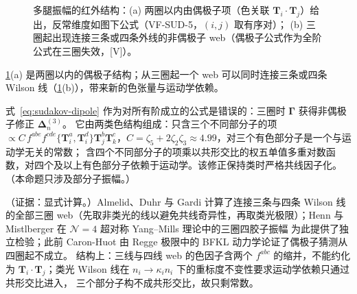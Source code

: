 \begin{figure}[htbp]
\caption{多腿振幅的红外结构：(a) 两圈以内由偶极子项（色关联 $\mathbf T_i\cdot\mathbf T_j$）给出，反常维度如图下公式（VF-SUD-5，$(i,j)$ 取有序对）；
(b) 三圈起出现连接三条或四条外线的非偶极子 web（偶极子公式作为全阶公式在三圈失效，[V]）。}
\label{fig:sudakov-dipole}
\end{figure}

\cref{fig:sudakov-dipole}(a) 是两圈以内的偶极子结构；从三圈起一个 web 可以同时连接三条或四条 Wilson 线（\cref{fig:sudakov-dipole}(b)），带来新的色张量与运动学依赖。

\begin{proposition}\label{prop:sudakov-dipole-violation}
式~\eqref{eq:sudakov-dipole} 作为对所有阶成立的公式是错误的：三圈时 $\boldsymbol\Gamma$ 获得非偶极子修正 $\boldsymbol\Delta^{(3)}_n$。
它由两类色结构组成：只含三个不同部分子的项 $\propto C\,f^{abe}f^{cde}\{\mathbf T_i^a,\mathbf T_i^d\}\mathbf T_j^b\mathbf T_k^c$，$C=\zeta_5+2\zeta_2\zeta_3\approx4.99$，对三个有色部分子是一个与运动学无关的常数；
含四个不同部分子的项乘以共形交比的权五单值多重对数函数，对四个及以上有色部分子依赖于运动学。该修正保持类时严格共线因子化\cite[式~(7)、(13)、(14)、(17)]{Almelid:2015jia}。
（本命题只涉及部分子振幅。）
\end{proposition}

\begin{proofsketch}
（证据：显式计算。）Almelid、Duhr 与 Gardi 计算了连接三条与四条 Wilson 线的全部三圈 web（先取非类光的线以避免共线奇异性，再取类光极限）\cite{Almelid:2015jia}；Henn 与 Mistlberger 在 $\mathcal N=4$ 超对称 Yang--Mills 理论中的三圈四胶子振幅
为此提供了独立检验\cite{Henn:2016jdu}；此前 Caron-Huot 由 Regge 极限中的 BFKL 动力学论证了偶极子猜测从四圈起不成立\cite[第~4.3~节，式~(4.28)]{Caron-Huot:2013fea}。
结构上：三线与四线 web 的色因子含两个 $f^{abc}$ 的缩并，不能约化为 $\mathbf T_i\cdot\mathbf T_j$；类光 Wilson 线在 $n_i\to\kappa_in_i$ 下的重标度不变性要求运动学依赖只通过共形交比进入，
三个部分子构不成共形交比，故只剩常数。
\end{proofsketch}

